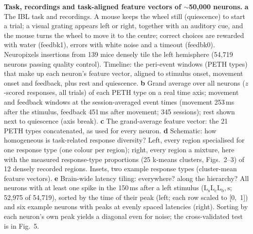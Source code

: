 \caption{\textbf{Task, recordings and task-aligned feature vectors of $\sim$50,000 neurons.}
\textbf{a} The IBL task and recordings. A mouse keeps the wheel still (quiescence) to start a trial; a visual grating appears left or right, together with an auditory cue, and the mouse turns the wheel to move it to the centre; correct choices are rewarded with water (feedbk1), errors with white noise and a timeout (feedbk0). Neuropixels insertions from 139 mice densely tile the left hemisphere (54,719 neurons passing quality control). Timeline: the peri-event windows (PETH types) that make up each neuron's feature vector, aligned to stimulus onset, movement onset and feedback, plus rest and quiescence.
\textbf{b} Grand average over all neurons ($z$-scored responses, all trials) of each PETH type on a real time axis; movement and feedback windows at the session-averaged event times (movement 253\,ms after the stimulus, feedback 451\,ms after movement; 345 sessions); rest shown next to quiescence (axis break).
\textbf{c} The grand-average feature vector: the 21 PETH types concatenated, as used for every neuron.
\textbf{d} Schematic: how homogeneous is task-related response diversity? Left, every region specialised for one response type (one colour per region); right, every region a mixture, here with the measured response-type proportions (25 k-means clusters, Figs.~2--3) of 12 densely recorded regions. Insets, two example response types (cluster-mean feature vectors).
\textbf{e} Brain-wide latency tiling: everywhere? along the hierarchy? All neurons with at least one spike in the 150\,ms after a left stimulus ($\mathrm{L_sL_cL_b,s}$; 52,975 of 54,719), sorted by the time of their peak (left; each row scaled to [0,~1]) and six example neurons with peaks at evenly spaced latencies (right). Sorting by each neuron's own peak yields a diagonal even for noise; the cross-validated test is in Fig.~5.}
\label{fig:task_data}
